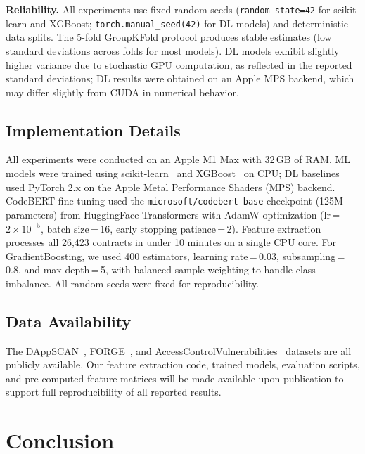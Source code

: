 \documentclass[11pt,a4paper]{article}
\begin{document}
\textbf{Reliability.}
All experiments use fixed random seeds (\texttt{random\_state=42} for scikit-learn and XGBoost; \texttt{torch.manual\_seed(42)} for DL models) and deterministic data splits.
The 5-fold GroupKFold protocol produces stable estimates (low standard deviations across folds for most models).
DL models exhibit slightly higher variance due to stochastic GPU computation, as reflected in the reported standard deviations; DL results were obtained on an Apple MPS backend, which may differ slightly from CUDA in numerical behavior.

\subsection{Implementation Details}

All experiments were conducted on an Apple M1 Max with 32\,GB of RAM.
ML models were trained using scikit-learn~\cite{pedregosa2011scikit} and XGBoost~\cite{chen2016xgboost} on CPU; DL baselines used PyTorch 2.x on the Apple Metal Performance Shaders (MPS) backend.
CodeBERT fine-tuning used the \texttt{microsoft/codebert-base} checkpoint (125M parameters) from HuggingFace Transformers with AdamW optimization (lr\,=\,$2 \times 10^{-5}$, batch size\,=\,16, early stopping patience\,=\,2).
Feature extraction processes all 26,423 contracts in under 10 minutes on a single CPU core.
For GradientBoosting, we used 400 estimators, learning rate\,=\,0.03, subsampling\,=\,0.8, and max depth\,=\,5, with balanced sample weighting to handle class imbalance.
All random seeds were fixed for reproducibility.

\subsection{Data Availability}

The DAppSCAN~\cite{wu2023dappscan}, FORGE~\cite{chen2025forge}, and AccessControlVulnerabilities~\cite{liu2025acbenchmark} datasets are all publicly available.
Our feature extraction code, trained models, evaluation scripts, and pre-computed feature matrices will be made available upon publication to support full reproducibility of all reported results.

\section{Conclusion}
\label{sec:conclusion}
\end{document}
